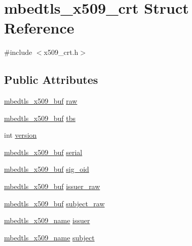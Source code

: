\hypertarget{structmbedtls__x509__crt}{\section{mbedtls\-\_\-x509\-\_\-crt Struct Reference}
\label{structmbedtls__x509__crt}
}


{\ttfamily \#include $<$x509\-\_\-crt.\-h$>$}

\subsection*{Public Attributes}
\begin{DoxyCompactItemize}
\item 
\hyperlink{group__x509__module_ga4d02c9e8e4e2934555e0d132cd2976dc}{mbedtls\-\_\-x509\-\_\-buf} \hyperlink{structmbedtls__x509__crt_a5bfef6b8b81bc081f796cb1f6bb28839}{raw}
\item 
\hyperlink{group__x509__module_ga4d02c9e8e4e2934555e0d132cd2976dc}{mbedtls\-\_\-x509\-\_\-buf} \hyperlink{structmbedtls__x509__crt_a44e9a884baad5737ef0930af94ca3f94}{tbs}
\item 
int \hyperlink{structmbedtls__x509__crt_a879ea07a05ab857c0f5793572bf1696e}{version}
\item 
\hyperlink{group__x509__module_ga4d02c9e8e4e2934555e0d132cd2976dc}{mbedtls\-\_\-x509\-\_\-buf} \hyperlink{structmbedtls__x509__crt_a5c3ae8b4aba6e1c40cb1f6a85da36116}{serial}
\item 
\hyperlink{group__x509__module_ga4d02c9e8e4e2934555e0d132cd2976dc}{mbedtls\-\_\-x509\-\_\-buf} \hyperlink{structmbedtls__x509__crt_a128c3a665ffdce696b402435a74e97aa}{sig\-\_\-oid}
\item 
\hyperlink{group__x509__module_ga4d02c9e8e4e2934555e0d132cd2976dc}{mbedtls\-\_\-x509\-\_\-buf} \hyperlink{structmbedtls__x509__crt_afb876a6a7b85e160620c4549324d9e8d}{issuer\-\_\-raw}
\item 
\hyperlink{group__x509__module_ga4d02c9e8e4e2934555e0d132cd2976dc}{mbedtls\-\_\-x509\-\_\-buf} \hyperlink{structmbedtls__x509__crt_ac30aeab20c2cdf74dae631d6d0691651}{subject\-\_\-raw}
\item 
\hyperlink{group__x509__module_ga2272228c7776102328df31623af3168c}{mbedtls\-\_\-x509\-\_\-name} \hyperlink{structmbedtls__x509__crt_ade48d67edd24629e28361d3fbc0aafd9}{issuer}
\item 
\hyperlink{group__x509__module_ga2272228c7776102328df31623af3168c}{mbedtls\-\_\-x509\-\_\-name} \hyperlink{structmbedtls__x509__crt_a773e92423092ab65e5e50031bd9663a5}{subject}

\end{DoxyCompactItemize}
